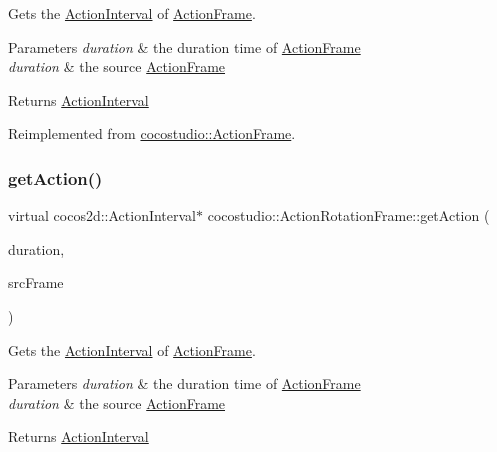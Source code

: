 Gets the \hyperlink{classActionInterval}{Action\+Interval} of \hyperlink{classcocostudio_1_1ActionFrame}{Action\+Frame}.


\begin{DoxyParams}{Parameters}
{\em duration} & the duration time of \hyperlink{classcocostudio_1_1ActionFrame}{Action\+Frame}\\
\hline
{\em duration} & the source \hyperlink{classcocostudio_1_1ActionFrame}{Action\+Frame}\\
\hline
\end{DoxyParams}
\begin{DoxyReturn}{Returns}
\hyperlink{classActionInterval}{Action\+Interval} 
\end{DoxyReturn}


Reimplemented from \hyperlink{classcocostudio_1_1ActionFrame_aad2a9c2314821270f5961416f4d7fb18}{cocostudio\+::\+Action\+Frame}.

\mbox{\label{classcocostudio_1_1ActionRotationFrame_ab713e9ea4332bb5cea201b7f6dc424fc}} 
\subsubsection{\texorpdfstring{get\+Action()}{getAction()}\hspace{0.1cm}{\footnotesize\ttfamily [4/4]}}
{\footnotesize\ttfamily virtual cocos2d\+::\+Action\+Interval$\ast$ cocostudio\+::\+Action\+Rotation\+Frame\+::get\+Action (\begin{DoxyParamCaption}\item[{float}]{duration,  }\item[{\hyperlink{classcocostudio_1_1ActionFrame}{Action\+Frame} $\ast$}]{src\+Frame }\end{DoxyParamCaption})\hspace{0.3cm}{\ttfamily [virtual]}}

Gets the \hyperlink{classActionInterval}{Action\+Interval} of \hyperlink{classcocostudio_1_1ActionFrame}{Action\+Frame}.


\begin{DoxyParams}{Parameters}
{\em duration} & the duration time of \hyperlink{classcocostudio_1_1ActionFrame}{Action\+Frame}\\
\hline
{\em duration} & the source \hyperlink{classcocostudio_1_1ActionFrame}{Action\+Frame}\\
\hline
\end{DoxyParams}
\begin{DoxyReturn}{Returns}
\hyperlink{classActionInterval}{Action\+Interval} 
\end{DoxyReturn}


